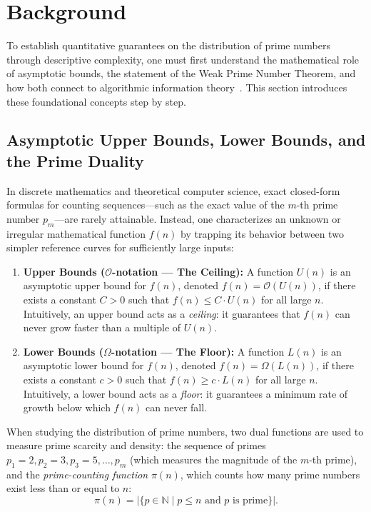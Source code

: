 \documentclass[acmsmall,natbib=false,nonacm]{acmart}
\begin{document}
\section{Background}
\label{sec:background}

To establish quantitative guarantees on the distribution of prime numbers through descriptive complexity, one must first understand the mathematical role of asymptotic bounds, the statement of the Weak Prime Number Theorem, and how both connect to algorithmic information theory~\cite{schoning1998gems, li2019introduction}. This section introduces these foundational concepts step by step.

\subsection{Asymptotic Upper Bounds, Lower Bounds, and the Prime Duality}
In discrete mathematics and theoretical computer science, exact closed-form formulas for counting sequences—such as the exact value of the $m$-th prime number $p_m$—are rarely attainable. Instead, one characterizes an unknown or irregular mathematical function $f(n)$ by trapping its behavior between two simpler reference curves for sufficiently large inputs:
\begin{enumerate}
    \item \textbf{Upper Bounds ($\mathcal{O}$-notation — The Ceiling):} A function $U(n)$ is an asymptotic upper bound for $f(n)$, denoted $f(n) = \mathcal{O}(U(n))$, if there exists a constant $C > 0$ such that $f(n) \le C \cdot U(n)$ for all large $n$. Intuitively, an upper bound acts as a \textit{ceiling}: it guarantees that $f(n)$ can never grow faster than a multiple of $U(n)$.
    \item \textbf{Lower Bounds ($\Omega$-notation — The Floor):} A function $L(n)$ is an asymptotic lower bound for $f(n)$, denoted $f(n) = \Omega(L(n))$, if there exists a constant $c > 0$ such that $f(n) \ge c \cdot L(n)$ for all large $n$. Intuitively, a lower bound acts as a \textit{floor}: it guarantees a minimum rate of growth below which $f(n)$ can never fall.
\end{enumerate}

When studying the distribution of prime numbers, two dual functions are used to measure prime scarcity and density: the sequence of primes $p_1 = 2, p_2 = 3, p_3 = 5, \dots, p_m$ (which measures the magnitude of the $m$-th prime), and the \textit{prime-counting function} $\pi(n)$, which counts how many prime numbers exist less than or equal to $n$:
\begin{equation}
    \pi(n) = |\{p \in \mathbb{N} \mid p \le n \text{ and } p \text{ is prime}\}|.
\end{equation}
\end{document}
